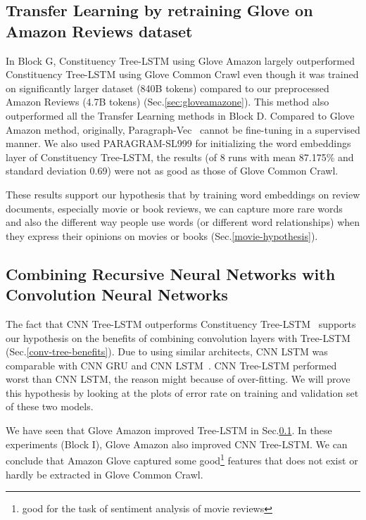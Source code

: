 \subsection{Transfer Learning by retraining Glove on Amazon Reviews dataset}
\label{fact:glove-amazon-improve-tree}
In Block G, Constituency Tree-LSTM using Glove Amazon largely outperformed Constituency Tree-LSTM using Glove Common Crawl even though it was trained on significantly larger dataset (840B tokens) compared to our preprocessed Amazon Reviews (4.7B tokens) (Sec.\ref{sec:gloveamazone}).
This method also outperformed all the Transfer Learning methods in Block D.
Compared to Glove Amazon method, originally,  Paragraph-Vec~\cite{ParagraphVec} cannot be fine-tuning in a supervised manner.
We also used PARAGRAM-SL999 for initializing the word embeddings layer of Constituency Tree-LSTM,
the results (of 8 runs with mean 87.175\% and standard deviation 0.69) were not as good as those of Glove Common Crawl.

These results support our hypothesis that by training word embeddings on review documents, especially movie or book reviews, we can capture more rare words and also the different way people use words (or different word relationships) when they express their opinions on movies or books (Sec.\ref{movie-hypothesis}).

\subsection{Combining Recursive Neural Networks with Convolution Neural Networks}
\label{proved:tree-conv-benefit}
The fact that CNN Tree-LSTM outperforms Constituency Tree-LSTM~\cite{treeLSTM} supports our hypothesis on the benefits of combining convolution layers with Tree-LSTM (Sec.\ref{conv-tree-benefits}).
Due to using similar architects, CNN LSTM was comparable with CNN GRU and CNN LSTM~\cite{cnn-rnn}. \label{unproved:cnn-treelstm-overfit}
CNN Tree-LSTM performed worst than CNN LSTM, the reason might because of over-fitting.
We will prove this hypothesis by looking at the plots of error rate on training and validation set of these two models.

\label{proved:Amazon-adv-Common}
We have seen that Glove Amazon improved Tree-LSTM in Sec.\ref{fact:glove-amazon-improve-tree}.
In these experiments (Block I), Glove Amazon also improved CNN Tree-LSTM.
We can conclude that Amazon Glove captured some good\footnote{good for the task of sentiment analysis of movie reviews} features that does not exist or hardly be extracted in Glove Common Crawl.

